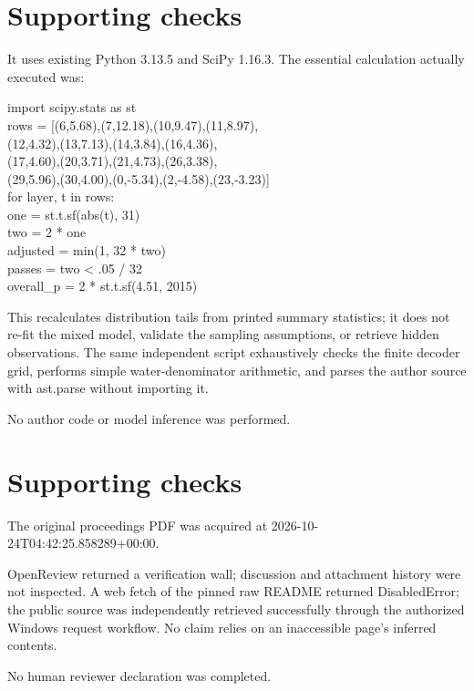 \documentclass[10pt]{article}
\begin{document}
\section*{Supporting checks}
It uses existing Python 3.13.5 and SciPy 1.16.3. The essential calculation actually executed was:\par
{\ttfamily\footnotesize import scipy.stats as st\\
rows = [(6,5.68),(7,12.18),(10,9.47),(11,8.97),\\
        (12,4.32),(13,7.13),(14,3.84),(16,4.36),\\
        (17,4.60),(20,3.71),(21,4.73),(26,3.38),\\
        (29,5.96),(30,4.00),(0,-5.34),(2,-4.58),(23,-3.23)]\\
for layer, t in rows:\\
    one = st.t.sf(abs(t), 31)\\
    two = 2 * one\\
    adjusted = min(1, 32 * two)\\
    passes = two < .05 / 32\\
overall\_p = 2 * st.t.sf(4.51, 2015)}\par
This recalculates distribution tails from printed summary statistics; it does not re-fit the mixed model, validate the sampling assumptions, or retrieve hidden observations. The same independent script exhaustively checks the finite decoder grid, performs simple water-denominator arithmetic, and parses the author source with ast.parse without importing it.\par
No author code or model inference was performed.\par
\section*{Supporting checks}
The original proceedings PDF was acquired at 2026-10-24T04:42:25.858289+00:00.\par
OpenReview returned a verification wall; discussion and attachment history were not inspected. A web fetch of the pinned raw README returned DisabledError; the public source was independently retrieved successfully through the authorized Windows request workflow. No claim relies on an inaccessible page’s inferred contents.\par
No human reviewer declaration was completed.\par
\end{document}
